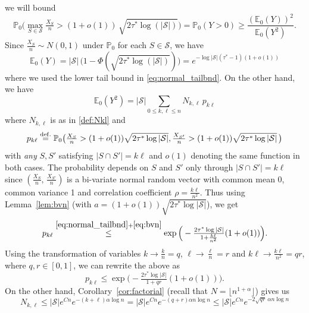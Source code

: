 \documentclass[11pt,reqno,letterpaper]{amsart}
\numberwithin{equation}{section}
\theoremstyle{plain}
\def \E{\mathbb{E}}
\def \P{\mathbb{P}}
\begin{document}
we will bound
\begin{equation}\label{eq:secmomineq}
\P_0\Big(\max\limits_{S\in \mathcal{S}} \tfrac{X_S}{n} > (1 + o(1)) \, \sqrt{2\tau^*\log(|\mathcal{S}|)} \Big) = \P_0(Y > 0) \ge \frac{(\E_0(Y))^2}{\E_0(Y^2)}.
\end{equation}
Since $\frac{X_S}{n} \sim N(0, 1)$ under $\P_0$ for each $S \in \mathcal S$, we 
have
\begin{equation}\label{eq:firstmom}
\E_0(Y) = |\mathcal S| \, \big(1 - \Phi(\sqrt{2\tau^*\log(|\mathcal{S}|)})\big) = e^{-\log |\mathcal S|(\tau^\ast - 1)(1 + o(1))}
\end{equation} 
where we used the lower tail bound in \eqref{eq:normal_tailbnd}. On the other hand, we 
have
\begin{equation}\label{eq:secmomexp}
    \E_0(Y^2)  = |\mathcal S| \sum_{0 \le k, \ell \le n} N_{k, \ell} \, p_{k\ell}
\end{equation}
where $N_{k, \ell}$ is as in \eqref{def:Nkl} and
\begin{equation*}
p_{k\ell} \stackrel{{\rm def.}}{=} \P_0\big(\tfrac{X_S}{n} > (1 + o(1))\sqrt{2\tau^\ast \log |\mathcal S|},  \tfrac{X_{S'}}{n} > (1 + o(1))\sqrt{2\tau^\ast \log |\mathcal S|} \, \big)    
\end{equation*}
with {\em any} $S, S'$ satisfying $|S \cap S'| = k\ell$ and $o(1)$ denoting 
the same function in both cases. The probability depends on $S$ and $S'$ only 
through $|S \cap S'| = k\ell$ since $(\tfrac{X_S}{n}, \, \tfrac{X_{S'}}{n})$ is a 
bi-variate normal random vector with common mean $0$, common variance 1 and 
correlation coefficient $\rho = \frac{k\ell}{n^2}$. Thus using Lemma~\ref{lem:bvn} 
(with $a = (1 + o(1))\sqrt{2\tau^\ast \log |\mathcal S|}$), we get
\begin{equation*}
p_{k\ell} \stackrel{\eqref{eq:normal_tailbnd} + \eqref{eq:bvn}}{\le} \exp\Big(- \tfrac{2\tau^\ast \log |\mathcal S|}{1 + \frac{k\ell}{n^2}} (1 + o(1))\Big).
\end{equation*}
Using the transformation of variables $k \to \frac{k}{n} = q$, $\ell \to \frac{\ell}{n} = r$ and $k\ell \to \frac{k\ell}{n^2} = qr$, where $q, r \in [0, 1]$, we can rewrite %
the above as 
\begin{equation*}%
p_{k\ell} \le \exp\Big(- \tfrac{2\tau^\ast \log |\mathcal S|}{1 + qr} (1 + o(1))\Big).
\end{equation*}
On the other hand, Corollary~\ref{cor:factorial} (recall that $N = \lfloor n^{1 + \alpha}\rfloor$) gives us
\begin{equation*}
N_{k, \ell}\le |\mathcal S| e^{C n} e^{- (k + \ell)\alpha \log n} = |\mathcal S| e^{C n} e^{- (q + r)\alpha n \log n} \le |\mathcal S| e^{C n} e^{- 2\sqrt{qr}\,\alpha n \log n}
\end{equation*}
\end{document}
